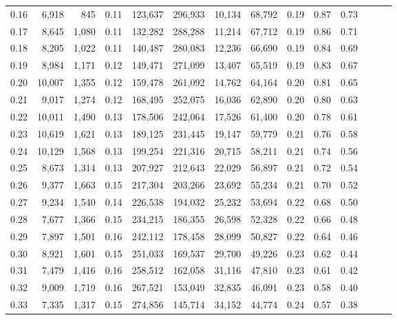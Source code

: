 \begin{tabular}{rrrrrrrrrrrrrr}
0.16 &   6,918 &    845 &  0.11 &  123,637 &  296,933 &  10,134 &  68,792 &  0.19 &  0.87 &      0.73 \\
0.17 &   8,645 &  1,080 &  0.11 &  132,282 &  288,288 &  11,214 &  67,712 &  0.19 &  0.86 &      0.71 \\
0.18 &   8,205 &  1,022 &  0.11 &  140,487 &  280,083 &  12,236 &  66,690 &  0.19 &  0.84 &      0.69 \\
0.19 &   8,984 &  1,171 &  0.12 &  149,471 &  271,099 &  13,407 &  65,519 &  0.19 &  0.83 &      0.67 \\
0.20 &  10,007 &  1,355 &  0.12 &  159,478 &  261,092 &  14,762 &  64,164 &  0.20 &  0.81 &      0.65 \\
0.21 &   9,017 &  1,274 &  0.12 &  168,495 &  252,075 &  16,036 &  62,890 &  0.20 &  0.80 &      0.63 \\
0.22 &  10,011 &  1,490 &  0.13 &  178,506 &  242,064 &  17,526 &  61,400 &  0.20 &  0.78 &      0.61 \\
0.23 &  10,619 &  1,621 &  0.13 &  189,125 &  231,445 &  19,147 &  59,779 &  0.21 &  0.76 &      0.58 \\
0.24 &  10,129 &  1,568 &  0.13 &  199,254 &  221,316 &  20,715 &  58,211 &  0.21 &  0.74 &      0.56 \\
0.25 &   8,673 &  1,314 &  0.13 &  207,927 &  212,643 &  22,029 &  56,897 &  0.21 &  0.72 &      0.54 \\
0.26 &   9,377 &  1,663 &  0.15 &  217,304 &  203,266 &  23,692 &  55,234 &  0.21 &  0.70 &      0.52 \\
0.27 &   9,234 &  1,540 &  0.14 &  226,538 &  194,032 &  25,232 &  53,694 &  0.22 &  0.68 &      0.50 \\
0.28 &   7,677 &  1,366 &  0.15 &  234,215 &  186,355 &  26,598 &  52,328 &  0.22 &  0.66 &      0.48 \\
0.29 &   7,897 &  1,501 &  0.16 &  242,112 &  178,458 &  28,099 &  50,827 &  0.22 &  0.64 &      0.46 \\
0.30 &   8,921 &  1,601 &  0.15 &  251,033 &  169,537 &  29,700 &  49,226 &  0.23 &  0.62 &      0.44 \\
0.31 &   7,479 &  1,416 &  0.16 &  258,512 &  162,058 &  31,116 &  47,810 &  0.23 &  0.61 &      0.42 \\
0.32 &   9,009 &  1,719 &  0.16 &  267,521 &  153,049 &  32,835 &  46,091 &  0.23 &  0.58 &      0.40 \\
0.33 &   7,335 &  1,317 &  0.15 &  274,856 &  145,714 &  34,152 &  44,774 &  0.24 &  0.57 &      0.38 \\

\end{tabular}
